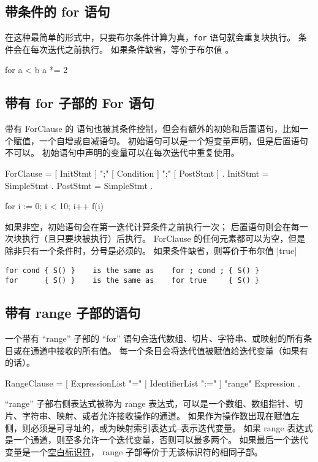 \subsection{带条件的 for 语句}
在这种最简单的形式中，只要布尔条件计算为真，\verb|for| 语句就会重复块执行。
条件会在每次迭代之前执行。
如果条件缺省，等价于布尔值 。
\begin{golang}
for a < b {
	a *= 2
}
\end{golang}

\subsection{带有 for 子部的 For 语句}
带有 ForClause 的  语句也被其条件控制，但会有额外的初始和后置语句，比如一个赋值，一个自增或自减语句。
初始语句可以是一个短变量声明，但是后置语句不可以。
初始语句中声明的变量可以在每次迭代中重复使用。
\begin{EBNF}
ForClause = [ InitStmt ] ";" [ Condition ] ";" [ PostStmt ] .
InitStmt = SimpleStmt .
PostStmt = SimpleStmt .
\end{EBNF}




\begin{golang}
for i := 0; i < 10; i++ {
	f(i)
}
\end{golang}

如果非空，初始语句会在第一迭代计算条件之前执行一次；
后置语句则会在每一次块执行（且只要块被执行）后执行。
ForClause 的任何元素都可以为空，但是除非只有一个条件时，分号是必须的。
如果条件缺省，则等价于布尔值 \code|true|
\begin{lstlisting}
for cond { S() }    is the same as    for ; cond ; { S() }
for      { S() }    is the same as    for true     { S() }
\end{lstlisting}

\subsection{带有 range 子部的语句}
一个带有 ``range'' 子部的 ``for'' 语句会迭代数组、切片、字符串、或映射的所有条目或在通道中接收的所有值。
每一个条目会将迭代值被赋值给迭代变量（如果有的话）。
\begin{EBNF}
RangeClause = [ ExpressionList "=" | IdentifierList ":=" ] "range" Expression .
\end{EBNF}

``range'' 子部右侧表达式被称为 range 表达式，可以是一个数组、数组指针、切片、字符串、映射、或者允许接收操作的通道。
如果作为操作数出现在赋值左侧，则必须是可寻址的，或为映射索引表达式--表示迭代变量。
如果 range 表达式是一个通道，则至多允许一个迭代变量，否则可以最多两个。
如果最后一个迭代变量是一个\hyperref[sec:blank identifier]{空白标识符}，
range 子部等价于无该标识符的相同子部。

